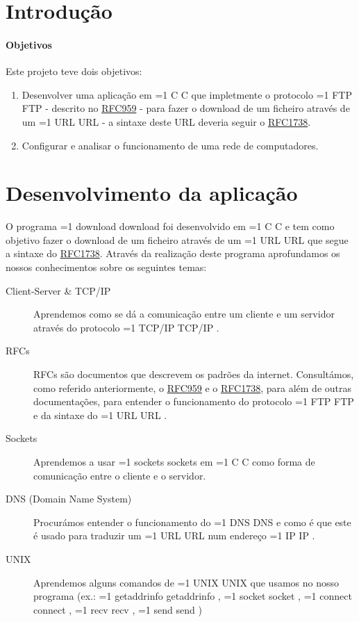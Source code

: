 \documentclass[11pt,a4paper]{article}
\newcommand{\hl}[2][1]{%
  \ifnum#1=1\relax
    \textcolor{text-hl1}{#2}%
  \else
    \textcolor{text-hl2}{#2}%
  \fi
}
\begin{document}
\begin{multicols}{2}

\section{Introdução}

\paragraph{Objetivos}
Este projeto teve dois objetivos:
\begin{enumerate}
    \item Desenvolver uma aplicação em \hl{C} que impletmente o protocolo \hl{FTP} - descrito no \href{https://datatracker.ietf.org/doc/html/rfc959}{RFC959} - para fazer o download de um ficheiro através de um \hl{URL} - a sintaxe deste URL deveria seguir o \href{https://datatracker.ietf.org/doc/html/rfc1738}{RFC1738}.
    \item Configurar e analisar o funcionamento de uma rede de computadores.
\end{enumerate}


\section{Desenvolvimento da aplicação}

O programa \hl{download} foi desenvolvido em \hl{C} e tem como objetivo fazer o download de um ficheiro através de um \hl{URL} que segue a sintaxe do \href{https://datatracker.ietf.org/doc/html/rfc1738}{RFC1738}.
Através da realização deste programa aprofundamos os nossos conhecimentos sobre os seguintes temas:
\begin{description}
    \item[Client-Server \& TCP/IP] Aprendemos como se dá a comunicação entre um cliente e um servidor através do protocolo \hl{TCP/IP}.
    \item[RFCs] RFCs são documentos que descrevem os padrões da internet. Consultámos, como referido anteriormente, o \href{https://datatracker.ietf.org/doc/html/rfc959}{RFC959} e o \href{https://datatracker.ietf.org/doc/html/rfc1738}{RFC1738}, para além de outras documentações, para entender o funcionamento do protocolo \hl{FTP} e da sintaxe do \hl{URL}.
    \item[Sockets] Aprendemos a usar \hl{sockets} em \hl{C} como forma de comunicação entre o cliente e o servidor.
    \item[DNS (Domain Name System)] Procurámos entender o funcionamento do \hl{DNS} e como é que este é usado para traduzir um \hl{URL} num endereço \hl{IP}.
    \item[UNIX] Aprendemos alguns comandos de \hl{UNIX} que usamos no nosso programa (ex.: \hl[2]{getaddrinfo}, \hl[2]{socket}, \hl[2]{connect}, \hl[2]{recv}, \hl[2]{send})
\end{description}


\end{multicols}
\end{document}
